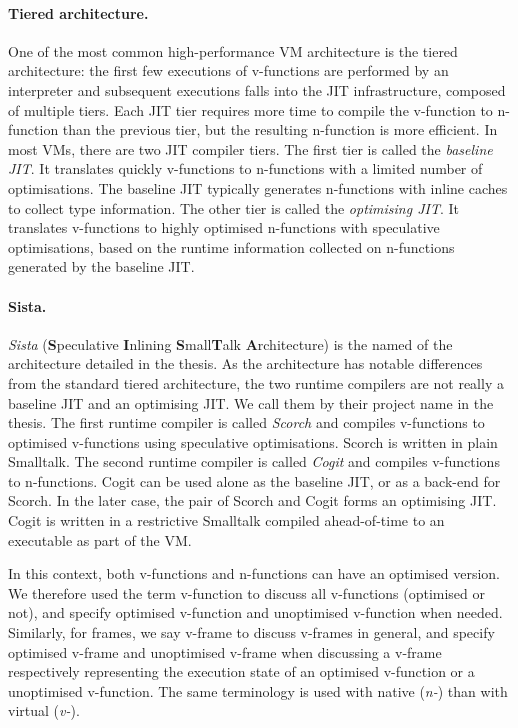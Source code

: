 \documentclass[a4paper,12pt,twoside]{../includes/ThesisStyle}
\begin{document}
\paragraph{Tiered architecture.} One of the most common high-performance VM architecture is the tiered architecture: the first few executions of v-functions are performed by an interpreter and subsequent executions falls into the JIT infrastructure, composed of multiple tiers. Each JIT tier requires more time to compile the v-function to n-function than the previous tier, but the resulting n-function is more efficient. In most VMs, there are two JIT compiler tiers. The first tier is called the \emph{baseline JIT}. It translates quickly v-functions to n-functions with a limited number of optimisations. The baseline JIT typically generates n-functions with inline caches to collect type information. The other tier is called the \emph{optimising JIT}. It translates v-functions to highly optimised n-functions with speculative optimisations, based on the runtime information collected on n-functions generated by the baseline JIT.

\paragraph{Sista.} \emph{Sista} (\textbf{S}peculative \textbf{I}nlining \textbf{S}mall\textbf{T}alk \textbf{A}rchitecture) is the named of the architecture detailed in the thesis. As the architecture has notable differences from the standard tiered architecture, the two runtime compilers are not really a baseline JIT and an optimising JIT. We call them by their project name in the thesis. The first runtime compiler is called \emph{Scorch} and compiles v-functions to optimised v-functions using speculative optimisations. Scorch is written in plain Smalltalk. The second runtime compiler is called \emph{Cogit} and compiles v-functions to n-functions. Cogit can be used alone as the baseline JIT, or as a back-end for Scorch. In the later case, the pair of Scorch and Cogit forms an optimising JIT. Cogit is written in a restrictive Smalltalk compiled ahead-of-time to an executable as part of the VM.

In this context, both v-functions and n-functions can have an optimised version. We therefore used the term v-function to discuss all v-functions (optimised or not), and specify optimised v-function and unoptimised v-function when needed. Similarly, for frames, we say v-frame to discuss v-frames in general, and specify optimised v-frame and unoptimised v-frame when discussing a v-frame respectively representing the execution state of an optimised v-function or a unoptimised v-function. The same terminology is used with native (\emph{n-}) than with virtual (\emph{v-}).
\end{document}
